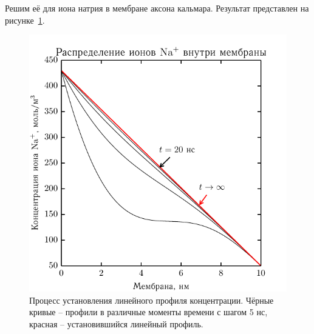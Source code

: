 \documentclass{hedwork}
\begin{document}
    Решим её для иона натрия в мембране аксона кальмара. Результат представлен
    на рисунке~\ref{fig:2}.
    \begin{figure}[h]
    \begin{center}
        \includegraphics[width=.7\textwidth]{plots/linear_conc}
    \end{center}
    \caption{Процесс установления линейного профиля концентрации. Чёрные кривые
    -- профили в различные моменты времени с шагом 5 нс, красная --
    установившийся линейный профиль.}
    \label{fig:2}
    \end{figure}
\newpage
\end{document}
